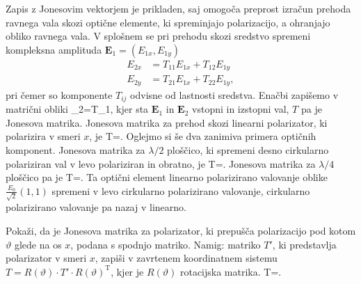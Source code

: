 Zapis z Jonesovim vektorjem je prikladen, saj omogoča preprost izračun
prehoda ravnega vala skozi optične elemente, ki spreminjajo polarizacijo,
a ohranjajo obliko ravnega vala. V splošnem se pri prehodu skozi
sredstvo spremeni kompleksna amplituda $\mathbf{E}_1 = (E_{1x}, E_{1y})$
\begin{align}
E_{2x} & =T_{11}E_{1x}+T_{12}E_{1y}\\
E_{2y} & =T_{21}E_{1x}+T_{22}E_{1y},
\end{align}
pri čemer so komponente $T_{ij}$ odvisne od lastnosti sredstva. Enačbi zapišemo 
v matrični obliki
\beq
{}_{2}=T\cdot{}_{1},
\eeq
kjer sta $\mathbf{E}_{1}$ in $\mathbf{E}_{2}$
vstopni in izstopni val, $T$ pa je Jonesova
matrika. Jonesova matrika za prehod skozi linearni polarizator, ki
polarizira v smeri $x$, je
\beq
T=\left[\begin{array}{cc}
1 & 0\\
0 & 0
\end{array}\right].
\eeq
Oglejmo si še dva zanimiva primera optičnih komponent.
Jonesova matrika za $\lambda/2$ ploščico,
ki spremeni desno cirkularno polariziran val v levo polariziran in obratno,
je
\beq
T=\left[\begin{array}{cc}
1 & 0\\
0 & -1
\end{array}\right].
\eeq
Jonesova matrika za $\lambda/4$ ploščico pa je 
\beq
T=\left[\begin{array}{cc}
1 & 0\\
0 & i
\end{array}\right].
\eeq
Ta optični element linearno polarizirano valovanje oblike $\frac{E_{0}}{\sqrt{2}}(1,1)$
spremeni v levo cirkularno polarizirano valovanje, cirkularno polarizirano
valovanje pa nazaj v linearno. 

\begin{definition}
Pokaži, da je Jonesova matrika za polarizator,
ki prepušča polarizacijo pod kotom $\vartheta$ glede na os $x$, podana s spodnjo matriko. 
Namig: matriko $T'$, ki predstavlja polarizator v smeri $x$, zapiši v zavrtenem
koordinatnem sistemu $T=R(\vartheta) \cdot {T'}\cdot R(\vartheta)^\textrm{T}$, 
kjer je $R(\vartheta)$ rotacijska matrika.
\beq
T=.
\eeq

\end{definition}

